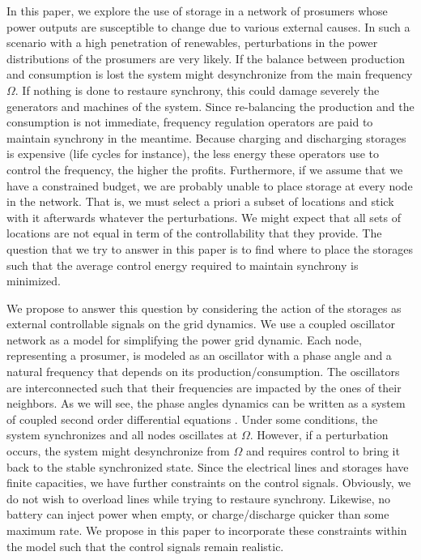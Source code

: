 \documentclass[conference]{IEEEtran}
\begin{document}
In this paper, we explore the use of storage in a network of prosumers whose power outputs are susceptible to change due to various external causes. In such a scenario with a high penetration of renewables, perturbations in the power distributions of the prosumers are very likely. If the balance between production and consumption is lost the system might desynchronize from the main frequency $\Omega$. If nothing is done to restaure synchrony, this could damage severely the generators and machines of the system. Since re-balancing the production and the consumption is not immediate, frequency regulation operators are paid to maintain synchrony in the meantime. Because charging and discharging storages is expensive (life cycles for instance), the less energy these operators use to control the frequency, the higher the profits. Furthermore, if we assume that we have a constrained budget, we are probably unable to place storage at every node in the network. That is, we must select a priori a subset of locations and stick with it afterwards whatever the perturbations. We might expect that all sets of locations are not equal in term of the controllability that they provide. The question that we try to answer in this paper is to find where to place the storages such that the average control energy required to maintain synchrony is minimized.

We propose to answer this question by considering the action of the storages as external controllable signals on the grid dynamics. We use a coupled oscillator network as a model for simplifying the power grid dynamic. Each node, representing a prosumer, is modeled as an oscillator with a phase angle and a natural frequency that depends on its production/consumption. The oscillators are interconnected such that their frequencies are impacted by the ones of their neighbors. As we will see, the phase angles dynamics can be written as a system of coupled second order differential equations \cite{Filatrella2008}. Under some conditions, the system synchronizes and all nodes oscillates at $\Omega$. However, if a perturbation occurs, the system might desynchronize from $\Omega$ and requires control to bring it back to the stable synchronized state. Since the electrical lines and storages have finite capacities, we have further constraints on the control signals. Obviously, we do not wish to overload lines while trying to restaure synchrony. Likewise, no battery can inject power when empty, or charge/discharge quicker than some maximum rate. We propose in this paper to incorporate these constraints within the model such that the control signals remain realistic. 
\end{document}
